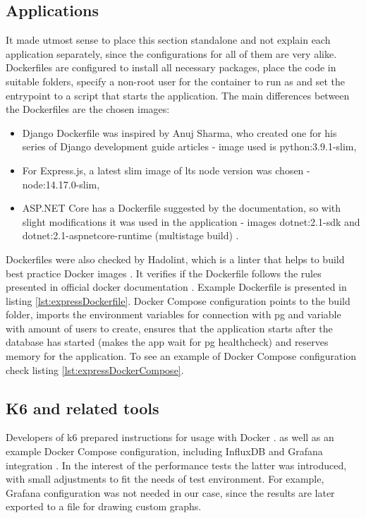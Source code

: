 \subsection{Applications}
It made utmost sense to place this section standalone and not explain each application separately, since the configurations for all of them are very alike.
Dockerfiles are configured to install all necessary packages, place the code in suitable folders, specify a non-root user for the container to run as and set the entrypoint to a script that starts the application.
The main differences between the Dockerfiles are the chosen images:
\begin{itemize}
    \item Django Dockerfile was inspired by Anuj Sharma, who created one for his series of Django development guide articles \cite{djangoDockerfile} - image used is python:3.9.1-slim,
    \item For Express.js, a latest slim image of \acrshort{lts} node version was chosen - node:14.17.0-slim,
    \item ASP.NET Core has a Dockerfile suggested by the documentation, so with slight modifications it was used in the application - images dotnet:2.1-sdk and dotnet:2.1-aspnetcore-runtime (multistage build) \cite{aspnetDockerfile}.
\end{itemize}
Dockerfiles were also checked by Hadolint, which is a linter that helps to build best practice Docker images \cite{hadolintGit}.
It verifies if the Dockerfile follows the rules presented in official docker documentation \cite{dockerBestPractices}.
Example Dockerfile is presented in listing \ref{lst:expressDockerfile}.
Docker Compose configuration points to the build folder, imports the environment variables for connection with \acrshort{pg} and variable with amount of users to create, ensures that the application starts after the database has started (makes the app wait for \acrlong{pg} healthcheck) and reserves memory for the application. To see an example of Docker Compose configuration check listing \ref{lst:expressDockerCompose}.



\subsection{K6 and related tools}
Developers of k6 prepared instructions for usage with Docker \cite{k6RunningLocalTests}.
as well as an example Docker Compose configuration, including InfluxDB and Grafana integration \cite{k6DockerCompose}.
In the interest of the performance tests the latter was introduced, with small adjustments to fit the needs of test environment. For example, Grafana configuration was not needed in our case, since the results are later exported to a file for drawing custom graphs.

